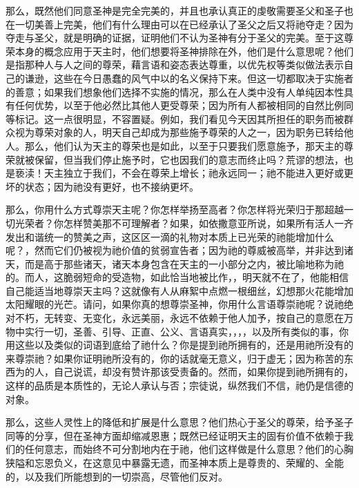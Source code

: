 那么，既然他们同意圣神是完全完美的，并且也承认真正的虔敬需要圣父和圣子也在一切美善上完美，他们有什么理由可以在已经承认了圣父之后又将祂夺走？因为夺走与圣父，就是明确的证据，证明他们不认为圣神有分于圣父的完美。至于这尊荣本身的概念应用于天主时，他们想要将圣神排除在外，他们是什么意思呢？他们是指那种人与人之间的尊荣，藉言语和姿态表达尊重，以优先权等类似做法表示自己的谦逊，这些在今日愚蠢的风气中以的名义保持下来。但这一切都取决于实施者的善意；如果我们想象他们选择不实施的情况，那么在人类中没有人单纯因本性具有任何优势，以至于他必然比其他人更受尊荣；因为所有人都被相同的自然比例同等标记。这一点很明显，不容置疑。例如，我们看见今天因其所担任的职务而被群众视为尊荣对象的人，明天自己却成为那些施予尊荣的人之一，因为职务已转给他人。那么，他们认为天主的尊荣也是如此，以至于只要我们愿意施予，那天主的尊荣就被保留，但当我们停止施予时，它也因我们的意志而终止吗？荒谬的想法，也是亵渎！天主独立于我们，不会在尊荣上增长；祂永远同一；祂不能进入更好或更坏的状态；因为祂没有更好，也不接纳更坏。\par

那么，你用什么方式尊崇天主呢？你怎样举扬至高者？你怎样将光荣归于那超越一切光荣者？你怎样赞美那不可理解者？如果，如依撒意亚所说，如果所有活人一齐发出和谐统一的赞美之声，这区区一滴的礼物对本质上已光荣的祂能增加什么呢？，然而它们仍被视为祂价值的贫弱宣告者；因为祂的尊威被高举，并非达到诸天，而是高于那些诸天，诸天本身包含在天主的一小部分之内，被比喻地称为祂的。而人，这脆弱短命的受造物，如此恰当地被比作，，明天就不在了，他能相信自己能适当地尊崇天主吗？这就像有人从麻絮中点燃一根细丝，幻想那火花能增加太阳耀眼的光芒。请问，如果你真的想尊崇圣神，你用什么言语尊崇祂呢？说祂绝对不朽，无转变、无变化，永远美丽，永远不依赖于他人加予，按自己的意愿在万物中实行一切，圣善、引导、正直、公义、言语真实，，，，以及所有类似的事，你用这些以及类似的词语到底给了祂什么？你是提到祂所拥有的，还是用祂所没有的来尊崇祂？如果你证明祂所没有的，你的话就毫无意义，归于虚无；因为称苦的东西为的人，自己说谎，却没有赞许那该受责备的。然而，如果你提到祂所拥有的，这样的品质是本质性的，无论人承认与否；宗徒说，纵然我们不信，祂仍是信德的对象。\par

那么，这些人灵性上的降低和扩展是什么意思？他们热心于圣父的尊荣，给予圣子同等的分享，但在圣神方面却缩减恩惠；既然已经证明天主的固有价值不依赖于我们的任何意志，而始终不可分割地内在于祂，他们这样做是什么意思？他们的心胸狭隘和忘恩负义，在这意见中暴露无遗，而圣神本质上是尊贵的、荣耀的、全能的，以及我们所能想到的一切崇高，尽管他们反对。\par

